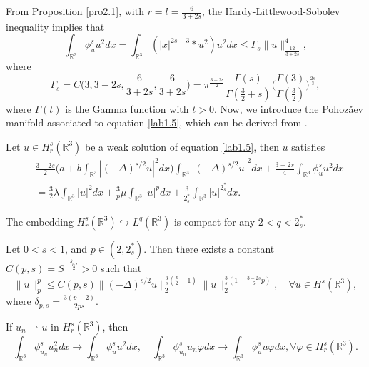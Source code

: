 \documentclass[reqno]{amsart}
\begin{document}
From Proposition \ref{pro2.1},  with  $r=l=\frac{6}{3+2s}$, the
 Hardy-Littlewood-Sobolev inequality implies that
\begin{equation}\label{3.3}
\int_{\mathbb{R}^3}\phi^s_u u^2dx=\int_{\mathbb{R}^3}
\left(|x|^{2s-3}\ast u^2\right)u^2dx\leq \Gamma_s\|u\|^4_{\frac{12}{3+2s}},
\end{equation}
where
\[
\Gamma_s=C\big(3, 3-2s, \frac{6}{3+2s}, \frac{6}{3+2s}\big)=\pi^{\frac{3-2s}{2}}
\frac{\Gamma(s)}{\Gamma(\frac{3}{2}+s)}\Big(\frac{\Gamma(3)}
{\Gamma(\frac{3}{2})}\Big)^{\frac{2s}{3}},
\]
where $\Gamma(t)$ is  the Gamma function with $t>0$.
Now, we introduce the Pohoz{\v{a}}ev manifold associated to equation  \eqref{lab1.5},
which can be derived from \cite{T7899}.

\begin{proposition}\label{pro2.2}
Let $u\in H^s_r(\mathbb{R}^3)$ be a weak solution of equation  \eqref{lab1.5},
then $u$ satisfies
\begin{align*}
&\frac{3-2s}{2}\Big(a+b\int_{\mathbb{R}^3}|(-\Delta)^{s/2}u|^2dx\Big)
 \int_{\mathbb{R}^3}|(-\Delta)^{s/2}u|^2dx
 +\frac{3+2s}{4}\int_{\mathbb{R}^3}\phi^s_u u^2dx\\
&=\frac{3}{2}\lambda \int_{\mathbb{R}^3}|u|^2dx
 +\frac{3}{p}\mu \int_{\mathbb{R}^3}|u|^pdx
 +\frac{3}{2^*_s}\int_{\mathbb{R}^3}|u|^{2^*_s}dx.
\end{align*}
\end{proposition}

\begin{lemma}[\cite{D1688}] \label{lem2.1311}
The embedding $H^s_r(\mathbb{R}^3)\hookrightarrow L^q(\mathbb{R}^3)$ is compact for
 any $2< q < 2^*_s$.
\end{lemma}

\begin{lemma} \label{lem3.2}
Let $0<s<1$, and $p\in(2, 2^*_s)$. Then there exists a constant
$C(p,s)=S^{-\frac{\delta_{p,s}}{2}}>0$ such that
\begin{equation}\label{3.2}
\|u\|^p_p\leq C(p,s)\|(-\Delta)^{s/2}u\|^{\frac{3}{s}(\frac{p}{2}-1)}_2
\|u\|^{\frac{3}{s}(1-\frac{3-2s}{6}p)}_2, \quad \forall u\in H^s(\mathbb{R}^3),
\end{equation}
where $\delta_{p,s}=\frac{3(p-2)}{2ps}$.
\end{lemma}

\begin{lemma}[\cite{D1678}] \label{lem2.171}
If $u_n\rightharpoonup u$ in $H^s_r(\mathbb{R}^3)$, then
\[
\int_{\mathbb{R}^3}\phi^s_{u_n}u^2_ndx\to \int_{\mathbb{R}^3}\phi^s_{u}u^2dx,\quad
\int_{\mathbb{R}^3}\phi^s_{u_n}u_n\varphi dx\to \int_{\mathbb{R}^3}\phi^s_{u}u\varphi dx, \forall \varphi\in H^s_r(\mathbb{R}^3).
\]
\end{lemma}
\end{document}
